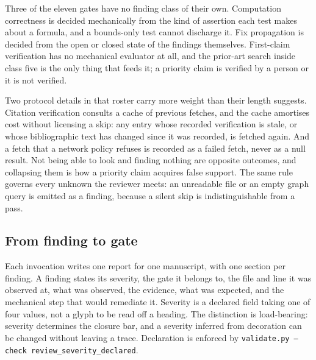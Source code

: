 \documentclass[11pt]{article}
\begin{document}
\begin{table}[h]
\centering

\caption{The eight finding classes, the readiness gate each
backstops, and the evidence each requires. The classes are not worked
in gate order, because the order above puts the cheapest-to-refute
claims first.}
\label{tab:finding_classes}
\end{table}

Three of the eleven gates have no finding class of their own.
Computation correctness is decided mechanically from the kind of
assertion each test makes about a formula, and a bounds-only test
cannot discharge it. Fix propagation is decided from the open or
closed state of the findings themselves. First-claim verification has
no mechanical evaluator at all, and the prior-art search inside class
five is the only thing that feeds it; a priority claim is verified by
a person or it is not verified.

Two protocol details in that roster carry more weight than their
length suggests. Citation verification consults a cache of previous
fetches, and the cache amortises cost without licensing a skip: any
entry whose recorded verification is stale, or whose bibliographic
text has changed since it was recorded, is fetched again. And a fetch
that a network policy refuses is recorded as a failed fetch, never as
a null result. Not being able to look and finding nothing are
opposite outcomes, and collapsing them is how a priority claim
acquires false support. The same rule governs every unknown the
reviewer meets: an unreadable file or an empty graph query is emitted
as a finding, because a silent skip is indistinguishable from a pass.

\subsection{From finding to gate}

Each invocation writes one report for one manuscript, with one
section per finding. A finding states its severity, the gate it
belongs to, the file and line it was observed at, what was observed,
the evidence, what was expected, and the mechanical step that would
remediate it. Severity is a declared field taking one of four values,
not a glyph to be read off a heading. The distinction is
load-bearing: severity determines the closure bar, and a severity
inferred from decoration can be changed without leaving a trace.
Declaration is enforced by
\texttt{validate.py --check review\_severity\_declared}.
\end{document}
